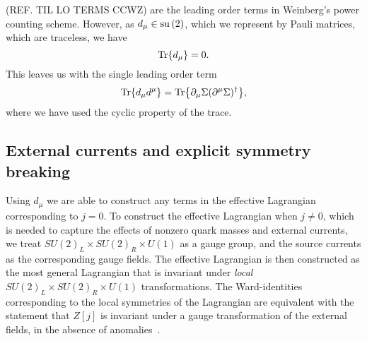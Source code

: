 (REF. TIL LO TERMS CCWZ) are the leading order terms in Weinberg's power counting scheme.
However, as $d_\mu \in \mathrm{su}\left(2\right)$, which we represent by Pauli matrices, which are traceless, we have
\begin{equation}
    \Tr{d_\mu} = 0.
\end{equation}
This leaves us with the single leading order term
\begin{equation}
    \Tr{d_\mu d^\mu} = \Tr{\partial_\mu \Sigma (\partial^\mu \Sigma)^\dagger},
\end{equation}
where we have used the cyclic property of the trace.

\subsection*{External currents and explicit symmetry breaking}
\label{Covarinat derivative}

Using $d_\mu$ we are able to construct any terms in the effective Lagrangian corresponding to $j=0$.
To construct the effective Lagrangian when $j \neq 0$, which is needed to capture the effects of nonzero quark masses and external currents, we treat $SU(2)_L\times SU(2)_R\times U(1)$ as a gauge group, and the source currents as the corresponding gauge fields.
The effective Lagrangian is then constructed as the most general Lagrangian that is invariant under \emph{local} $SU(2)_L\times SU(2)_R\times U(1)$ transformations.
The Ward-identities corresponding to the local symmetries of the Lagrangian are equivalent with the statement that $Z[j]$ is invariant under a gauge transformation of the external fields, in the absence of anomalies~\cite{Leutwyler:on_the_fundations}.

